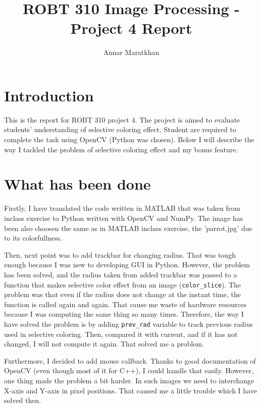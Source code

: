 \documentclass{IEEEtran}
\begin{document}
\title{ROBT 310 Image Processing - Project 4 Report}

\author{Anuar Maratkhan}

\maketitle

\section{Introduction}
This is the report for ROBT 310 project 4. The project is aimed to evaluate students' understanding of selective coloring effect. Student are required to complete the task using OpenCV (Python was chosen). Below I will describe the way I tackled the problem of selective coloring effect and my bonus feature.

\section{What has been done}
Firstly, I have translated the code written in MATLAB that was taken from inclass exercise to Python written with OpenCV and NumPy. The image has been also choosen the same as in MATLAB inclass exercise, the 'parrot.jpg' due to its colorfullness.

Then, next point was to add trackbar for changing radius. That was tough enough because I was new to developing GUI in Python. However, the problem has been solved, and the radius taken from added trackbar was passed to a function that makes selective color effect from an image (\texttt{color{\_}slice}). The problem was that even if the radius does not change at the instant time, the function is called again and again. That cause me waste of hardware resources because I was computing the same thing so many times. Therefore, the way I have solved the problem is by adding \texttt{prev{\_}rad} variable to track previous radius used in selective coloring. Then, compared it with current, and if it has not changed, I will not compute it again. That solved me a problem.

Furthermore, I decided to add mouse callback. Thanks to good documentation of OpenCV (even though most of it for C++), I could handle that easily. However, one thing made the problem a bit harder. In such images we need to interchange X-axis and Y-axis in pixel positions. That caused me a little trouble which I have solved then.
\end{document}
